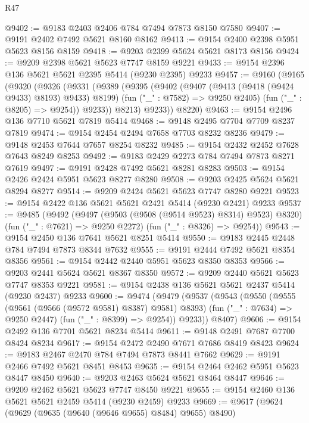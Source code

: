 \begin{lexlean}{R47}
\begin{coremodule}
@9402 := @9183 @2403 @2406 @784 @7494 @7873 @8150 @7580
@9407 := @9191 @2402 @7492 @5621 @8160 @8162
@9413 := @9154 @2400 @2398 @5951 @5623 @8156 @8159
@9418 := @9203 @2399 @5624 @5621 @8173 @8156
@9424 := @9209 @2398 @5621 @5623 @7747 @8159 @9221
@9433 := @9154 @2396 @136 @5621 @5621 @2395 @5414 (@9230 @2395) @9233
@9457 := @9160
    (@9165
      (@9320
        (@9326
          (@9331
            (@9389
              (@9395
                (@9402
                  (@9407 (@9413 (@9418 (@9424 @9433) @8193) @9433) @8199)
                  (fun ("_" : @7582) => @9250 @2405)
                  (fun ("_" : @8205) => @9254))
                @9233))
            @8213)
          @9233))
      @8220)
@9463 := @9154 @2496 @136 @7710 @5621 @7819 @5414
@9468 := @9148 @2495 @7704 @7709 @8237 @7819
@9474 := @9154 @2454 @2494 @7658 @7703 @8232 @8236
@9479 := @9148 @2453 @7644 @7657 @8254 @8232
@9485 := @9154 @2432 @2452 @7628 @7643 @8249 @8253
@9492 := @9183 @2429 @2273 @784 @7494 @7873 @8271 @7619
@9497 := @9191 @2428 @7492 @5621 @8281 @8283
@9503 := @9154 @2426 @2424 @5951 @5623 @8277 @8280
@9508 := @9203 @2425 @5624 @5621 @8294 @8277
@9514 := @9209 @2424 @5621 @5623 @7747 @8280 @9221
@9523 := @9154 @2422 @136 @5621 @5621 @2421 @5414 (@9230 @2421) @9233
@9537 := @9485
    (@9492
      (@9497 (@9503 (@9508 (@9514 @9523) @8314) @9523) @8320)
      (fun ("_" : @7621) => @9250 @2272)
      (fun ("_" : @8326) => @9254))
@9543 := @9154 @2450 @136 @7641 @5621 @8251 @5414
@9550 := @9183 @2445 @2448 @784 @7494 @7873 @8344 @7632
@9555 := @9191 @2444 @7492 @5621 @8354 @8356
@9561 := @9154 @2442 @2440 @5951 @5623 @8350 @8353
@9566 := @9203 @2441 @5624 @5621 @8367 @8350
@9572 := @9209 @2440 @5621 @5623 @7747 @8353 @9221
@9581 := @9154 @2438 @136 @5621 @5621 @2437 @5414 (@9230 @2437) @9233
@9600 := @9474
    (@9479
      (@9537
        (@9543
          (@9550
            (@9555 (@9561 (@9566 (@9572 @9581) @8387) @9581) @8393)
            (fun ("_" : @7634) => @9250 @2447)
            (fun ("_" : @8399) => @9254))
          @9233))
      @8407)
@9606 := @9154 @2492 @136 @7701 @5621 @8234 @5414
@9611 := @9148 @2491 @7687 @7700 @8424 @8234
@9617 := @9154 @2472 @2490 @7671 @7686 @8419 @8423
@9624 := @9183 @2467 @2470 @784 @7494 @7873 @8441 @7662
@9629 := @9191 @2466 @7492 @5621 @8451 @8453
@9635 := @9154 @2464 @2462 @5951 @5623 @8447 @8450
@9640 := @9203 @2463 @5624 @5621 @8464 @8447
@9646 := @9209 @2462 @5621 @5623 @7747 @8450 @9221
@9655 := @9154 @2460 @136 @5621 @5621 @2459 @5414 (@9230 @2459) @9233
@9669 := @9617
    (@9624
      (@9629 (@9635 (@9640 (@9646 @9655) @8484) @9655) @8490)

\end{coremodule}
\end{lexlean}

